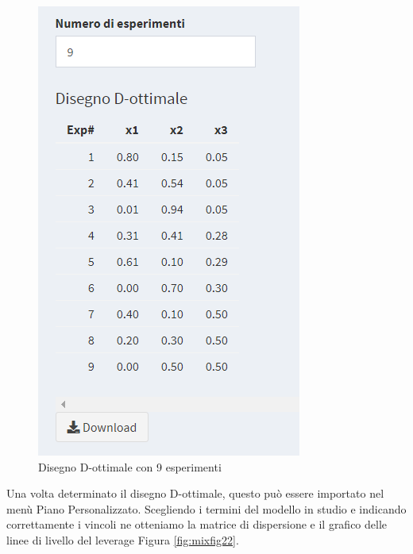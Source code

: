 \documentclass[
  11pt,
]{book}
\begin{document}
\begin{figure}[ht]

{\centering \includegraphics[width=1\linewidth]{Immagini/Mixt/21_disDopt} 

}

\caption{Disegno D-ottimale con 9 esperimenti}\label{fig:mixfig21}
\end{figure}

Una volta determinato il disegno D-ottimale, questo può essere importato nel menù Piano Personalizzato. Scegliendo i termini del modello in studio e indicando correttamente i vincoli ne otteniamo la matrice di dispersione e il grafico delle linee di livello del leverage Figura \ref{fig:mixfig22}.
\end{document}
